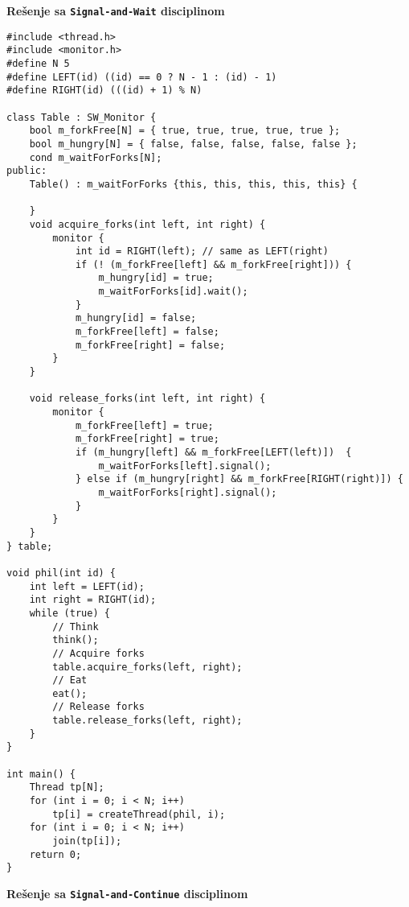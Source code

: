 \textbf{Re\v{s}enje sa \texttt{Signal-and-Wait} disciplinom}
\begin{lstlisting}
#include <thread.h>
#include <monitor.h>
#define N 5
#define LEFT(id) ((id) == 0 ? N - 1 : (id) - 1)
#define RIGHT(id) (((id) + 1) % N)

class Table : SW_Monitor {
    bool m_forkFree[N] = { true, true, true, true, true };
    bool m_hungry[N] = { false, false, false, false, false };
    cond m_waitForForks[N];
public:
    Table() : m_waitForForks {this, this, this, this, this} {
        
    }
    void acquire_forks(int left, int right) {
        monitor {
            int id = RIGHT(left); // same as LEFT(right)
            if (! (m_forkFree[left] && m_forkFree[right])) {
                m_hungry[id] = true;
                m_waitForForks[id].wait();
            }
            m_hungry[id] = false;
            m_forkFree[left] = false;
            m_forkFree[right] = false;
        }
    }

    void release_forks(int left, int right) {
        monitor {
            m_forkFree[left] = true;
            m_forkFree[right] = true;
            if (m_hungry[left] && m_forkFree[LEFT(left)])  {
                m_waitForForks[left].signal();
            } else if (m_hungry[right] && m_forkFree[RIGHT(right)]) {
                m_waitForForks[right].signal();
            }
        }
    }
} table;

void phil(int id) {
    int left = LEFT(id);
    int right = RIGHT(id);
    while (true) {
        // Think
        think();
        // Acquire forks
        table.acquire_forks(left, right);
        // Eat
        eat();
        // Release forks
        table.release_forks(left, right);
    }
}

int main() {
    Thread tp[N];
    for (int i = 0; i < N; i++) 
        tp[i] = createThread(phil, i);
    for (int i = 0; i < N; i++) 
        join(tp[i]);
    return 0;
}

\end{lstlisting}
\textbf{Re\v{s}enje sa \texttt{Signal-and-Continue} disciplinom}
